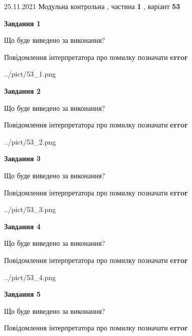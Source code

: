 \documentclass[10pt, ukrainian]{article}
\begin{document}
{25.11.2021 Модульна контрольна , частина \textbf { 1 }, варіант  \No \textbf { 53 }\par}
{
\begin {large}

{\begin {center}\textbf{Завдання 1}\end {center}}\par
Що буде виведено за виконання? \par
Повідомлення інтерпретатора про помилку позначати \textbf{error}

\begin{center}
	{../pict/53_1.png}
\end{center}
\newpage

{\begin {center}\textbf{Завдання 2}\end {center}}\par
Що буде виведено за виконання? \par
Повідомлення інтерпретатора про помилку позначати \textbf{error}

\begin{center}
	{../pict/53_2.png}
\end{center}
\newpage

{\begin {center}\textbf{Завдання 3}\end {center}}\par
Що буде виведено за виконання? \par
Повідомлення інтерпретатора про помилку позначати \textbf{error}

\begin{center}
	{../pict/53_3.png}
\end{center}
\newpage

{\begin {center}\textbf{Завдання 4}\end {center}}\par
Що буде виведено за виконання? \par
Повідомлення інтерпретатора про помилку позначати \textbf{error}

\begin{center}
	{../pict/53_4.png}
\end{center}
\newpage

{\begin {center}\textbf{Завдання 5}\end {center}}\par
Що буде виведено за виконання? \par
Повідомлення інтерпретатора про помилку позначати \textbf{error}


\end{large}}
\end{document}
